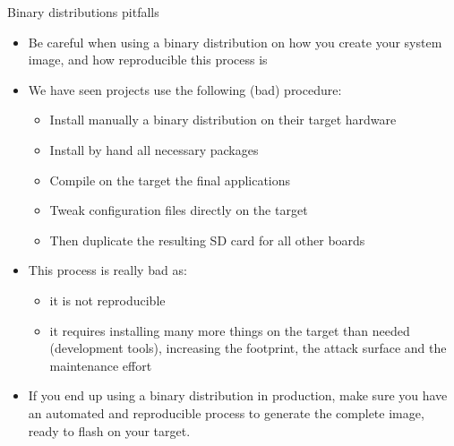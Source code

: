 \begin{frame}{Binary distributions pitfalls}
  \begin{itemize}
  \item Be careful when using a binary distribution on how you create
    your system image, and how reproducible this process is
  \item We have seen projects use the following (bad) procedure:
    \begin{itemize}
    \item Install manually a binary distribution on their target hardware
    \item Install by hand all necessary packages
    \item Compile on the target the final applications
    \item Tweak configuration files directly on the target
    \item Then duplicate the resulting SD card for all other boards
    \end{itemize}
  \item This process is really bad as:
    \begin{itemize}
    \item it is not reproducible
    \item it requires installing many more things on the target than
      needed (development tools), increasing the footprint, the attack
      surface and the maintenance effort
    \end{itemize}
  \item If you end up using a binary distribution in production, make
    sure you have an automated and reproducible process to generate
    the complete image, ready to flash on your target.
  \end{itemize}
\end{frame}

